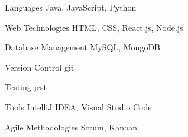 
\begin{cvskills}
  \cvskill
    {Languages} %
    {Java, JavaScript, Python} %

  \cvskill
    {Web Technologies} %
    {HTML, CSS, React.js, Node.js} %
  
  \cvskill
    {Database Management} %
    {MySQL, MongoDB} %

  \cvskill
    {Version Control} %
    {git} %

  \cvskill
    {Testing} %
    {jest} %

  \cvskill
    {Tools} %
    {IntelliJ IDEA, Visual Studio Code} %

  \cvskill
    {Agile Methodologies} %
    {Scrum, Kanban} %
\end{cvskills}

